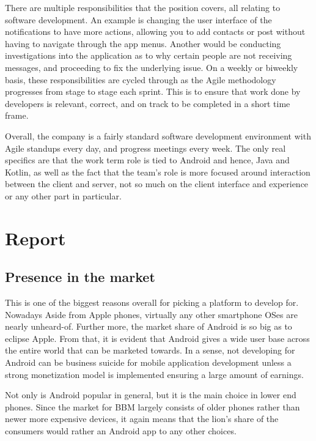\documentclass[12pt, letterpaper]{article}
\begin{document}
There are multiple responsibilities that the position covers, all relating
to software development. An example is changing the user interface of the 
notifications to have more actions, allowing you to add contacts or post 
without having to navigate through the app menus. Another would be 
conducting investigations into the application as to why certain people 
are not receiving messages, and proceeding to fix the underlying issue.
On a weekly or biweekly basis, these responsibilities are cycled through
as the Agile methodology progresses from stage to stage each sprint.
This is to ensure that work done by developers is relevant, correct, and on
track to be completed in a short time frame.

Overall, the company is a fairly standard software development environment
with Agile standups every day, and progress meetings every week. The only 
real specifics are that the work term role is tied to Android and hence, 
Java and Kotlin, as well as the fact that the team's role is more focused 
around interaction between the client and server, not so much on the client
interface and experience or any other part in particular.

\section{Report}

\subsection{Presence in the market}
This is one of the biggest reasons overall for picking a platform to
develop for. Nowadays Aside from Apple phones, virtually any other
smartphone OSes are nearly unheard-of. Further more, the market share of
Android is so big as to eclipse Apple\cite{marketshare}. From that, it
is evident that Android gives a wide user base across the entire world
that can be marketed towards. In a sense, not developing for Android can
be business suicide for mobile application development unless a strong
monetization model is implemented ensuring a large amount of earnings.

Not only is Android popular in general, but it is the main choice in
lower end phones. Since the market for BBM largely consists of older
phones rather than newer more expensive devices, it again means that
the lion's share of the consumers would rather an Android app to 
any other choices.
\end{document}
